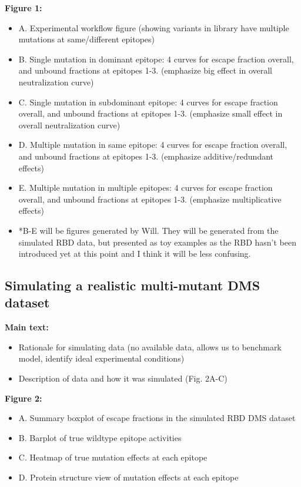 \documentclass{article}
\begin{document}
\noindent\textbf{Figure 1:}
\begin{itemize}
	\item A. Experimental workflow figure (showing variants in library have multiple mutations at same/different epitopes)
	\item B. Single mutation in dominant epitope: 4 curves for escape fraction overall, and unbound fractions at epitopes 1-3. (emphasize big effect in overall neutralization curve)
	\item C. Single mutation in subdominant epitope: 4 curves for escape fraction overall, and unbound fractions at epitopes 1-3. (emphasize small effect in overall neutralization curve)
	\item D. Multiple mutation in same epitope: 4 curves for escape fraction overall, and unbound fractions at epitopes 1-3. (emphasize additive/redundant effects)
	\item E. Multiple mutation in multiple epitopes: 4 curves for escape fraction overall, and unbound fractions at epitopes 1-3. (emphasize multiplicative effects)
	\item *B-E will be figures generated by Will. They will be generated from the simulated RBD data, but presented as toy examples as the RBD hasn't been introduced yet at this point and I think it will be less confusing. 
\end{itemize}

\subsection*{Simulating a realistic multi-mutant DMS dataset}

\textbf{Main text:}
\begin{itemize}
	\item Rationale for simulating data (no available data, allows us to benchmark model, identify ideal experimental conditions)
	\item Description of data and how it was simulated (Fig. 2A-C)
\end{itemize}


\noindent\textbf{Figure 2:}
\begin{itemize}
	\item A. Summary boxplot of escape fractions in the simulated RBD DMS dataset
	\item B. Barplot of true wildtype epitope activities
	\item C. Heatmap of true mutation effects at each epitope 
	\item D. Protein structure view of mutation effects at each epitope
\end{itemize}
\end{document}
